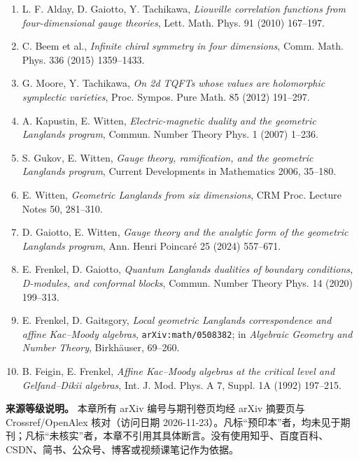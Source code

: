 \begin{enumerate}
\item L. F. Alday, D. Gaiotto, Y. Tachikawa, \emph{Liouville correlation functions from four-dimensional gauge theories}, Lett. Math. Phys. 91 (2010) 167--197.
\item C. Beem et al., \emph{Infinite chiral symmetry in four dimensions}, Comm. Math. Phys. 336 (2015) 1359--1433.
\item G. Moore, Y. Tachikawa, \emph{On 2d TQFTs whose values are holomorphic symplectic varieties}, Proc. Sympos. Pure Math. 85 (2012) 191--297.
\item A. Kapustin, E. Witten, \emph{Electric-magnetic duality and the geometric Langlands program}, Commun. Number Theory Phys. 1 (2007) 1--236.
\item S. Gukov, E. Witten, \emph{Gauge theory, ramification, and the geometric Langlands program}, Current Developments in Mathematics 2006, 35--180.
\item E. Witten, \emph{Geometric Langlands from six dimensions}, CRM Proc. Lecture Notes 50, 281--310.
\item D. Gaiotto, E. Witten, \emph{Gauge theory and the analytic form of the geometric Langlands program}, Ann. Henri Poincar\'e 25 (2024) 557--671.
\item E. Frenkel, D. Gaiotto, \emph{Quantum Langlands dualities of boundary conditions, D-modules, and conformal blocks}, Commun. Number Theory Phys. 14 (2020) 199--313.
\item E. Frenkel, D. Gaitsgory, \emph{Local geometric Langlands correspondence and affine Kac--Moody algebras}, \texttt{arXiv:math/0508382}; in \emph{Algebraic Geometry and Number Theory}, Birkh\"auser, 69--260.
\item B. Feigin, E. Frenkel, \emph{Affine Kac--Moody algebras at the critical level and Gelfand--Dikii algebras}, Int. J. Mod. Phys. A 7, Suppl. 1A (1992) 197--215.
\end{enumerate}

\noindent\textbf{来源等级说明。} 本章所有 arXiv 编号与期刊卷页均经 arXiv 摘要页与 Crossref/OpenAlex 核对（访问日期 2026-11-23）。凡标“预印本”者，均未见于期刊；凡标“未核实”者，本章不引用其具体断言。没有使用知乎、百度百科、CSDN、简书、公众号、博客或视频课笔记作为依据。
